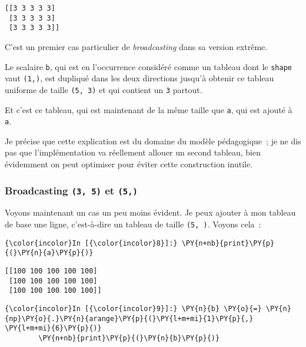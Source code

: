     \begin{Verbatim}[commandchars=\\\{\},frame=single,framerule=0.3mm,rulecolor=\color{cellframecolor}]
[[3 3 3 3 3]
 [3 3 3 3 3]
 [3 3 3 3 3]]
\end{Verbatim}

    C'est un premier cas particulier de \emph{broadcasting} dans sa version
extrême.

Le scalaire \texttt{b}, qui est en l'occurrence considéré comme un
tableau dont le \texttt{shape} vaut \texttt{(1,)}, est dupliqué dans les
deux directions jusqu'à obtenir ce tableau uniforme de taille
\texttt{(5,\ 3)} et qui contient un \texttt{3} partout.

Et c'est ce tableau, qui est maintenant de la même taille que
\texttt{a}, qui est ajouté à \texttt{a}.

    Je précise que cette explication est du domaine du modèle pédagogique~;
je ne dis pas que l'implémentation va réellement allouer un second
tableau, bien évidemment on peut optimiser pour éviter cette
construction inutile.

    \hypertarget{broadcasting-3-5-et-5}{%
\subsubsection{\texorpdfstring{Broadcasting \texttt{(3,\ 5)} et
\texttt{(5,)}}{Broadcasting (3, 5) et (5,)}}\label{broadcasting-3-5-et-5}}

    Voyons maintenant un cas un peu moins évident. Je peux ajouter à mon
tableau de base une ligne, c'est-à-dire un tableau de taille
\texttt{(5,\ )}. Voyons cela~:

    \begin{Verbatim}[commandchars=\\\{\},frame=single,framerule=0.3mm,rulecolor=\color{cellframecolor}]
{\color{incolor}In [{\color{incolor}8}]:} \PY{n+nb}{print}\PY{p}{(}\PY{n}{a}\PY{p}{)}
\end{Verbatim}


    \begin{Verbatim}[commandchars=\\\{\},frame=single,framerule=0.3mm,rulecolor=\color{cellframecolor}]
[[100 100 100 100 100]
 [100 100 100 100 100]
 [100 100 100 100 100]]
\end{Verbatim}

    \begin{Verbatim}[commandchars=\\\{\},frame=single,framerule=0.3mm,rulecolor=\color{cellframecolor}]
{\color{incolor}In [{\color{incolor}9}]:} \PY{n}{b} \PY{o}{=} \PY{n}{np}\PY{o}{.}\PY{n}{arange}\PY{p}{(}\PY{l+m+mi}{1}\PY{p}{,} \PY{l+m+mi}{6}\PY{p}{)}
        \PY{n+nb}{print}\PY{p}{(}\PY{n}{b}\PY{p}{)}
\end{Verbatim}


